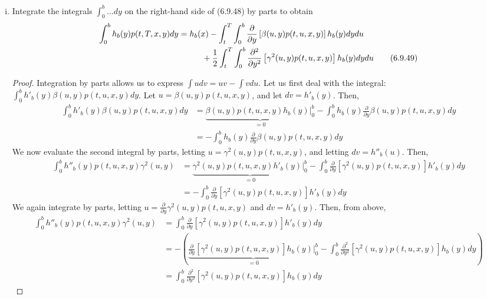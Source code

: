 \documentclass{article}
\theoremstyle{definition}
\theoremstyle{definition}
\begin{document}
\begin{enumerate}
\begin{enumerate}[(i)]
    \item Integrate the integrals $\int_0^b \hdots dy$ on the right-hand side of (6.9.48) by parts to obtain
       \begin{align}
        \int_0^b h_b(y) p(t,T,x,y) dy &= h_b(x) - \int_t^T \int_0^b \frac{\partial}{\partial y} \left[ \beta(u,y)p(t,u,x,y) \right] h_b(y) dy du  \notag \\
        & \hspace{1cm} + \frac{1}{2}\int_t^T \int_0^b  \frac{\partial^2}{\partial y^2} \left[ \gamma^2(u,y) p(t,u,x,y)\right] h_b(y) dydu \tag{6.9.49}
    \end{align}
    \begin{proof}
    Integration by parts allows us to express $\int u dv = uv -\int v du$. Let us first deal with the integral: $\int_0^b h'_b(y) \beta(u,y) p(t,u,x,y)dy$. Let $u=\beta(u,y)p(t,u,x,y)$, and let $dv=h'_b(y)$. Then,
    \begin{align*}
        \int_0^b h'_b(y) \beta(u,y) p(t,u,x,y)dy &= \underset{=0}{\underbrace{\beta(u,y)p(t,u,x,y)h_b(y) |^b_0}} - \int_0^b h_b(y) \frac{\partial}{\partial y}\beta(u,y)p(t,u,x,y)dy \\
        &=- \int_0^b h_b(y) \frac{\partial}{\partial y}\beta(u,y)p(t,u,x,y)dy
    \end{align*}
    We now evaluate the second integral by parts, letting $u =\gamma^2(u,y)p(t,u,x,y) $, and letting $dv=h''_b(u)$. Then,
    \begin{align*}\int_0^b h''_b(y)p(t,u,x,y) \gamma^2(u,y)&=\underset{=0}{\underbrace{\gamma^2(u,y)p(t,u,x,y)h'_b(y)|^b_0}} - \int_0^b \frac{\partial}{\partial y} \left[\gamma^2(u,y)p(t,u,x,y)\right]h'_b(y)dy \\
    &=- \int_0^b \frac{\partial}{\partial y} \left[\gamma^2(u,y)p(t,u,x,y)\right]h'_b(y)dy 
    \end{align*}
    We again integrate by parts, letting $u=\frac{\partial}{\partial y}\gamma^2(u,y)p(t,u,x,y)$ and $dv = h'_b(y)$. Then, from above,
    \begin{align*}
        \int_0^b h''_b(y)p(t,u,x,y) \gamma^2(u,y)&=\int_0^b \frac{\partial}{\partial y} \left[\gamma^2(u,y)p(t,u,x,y)\right]h'_b(y)dy  \\
        &= -\left( \underset{=0}{\underbrace{\frac{\partial}{\partial y}\left[\gamma^2(u,y)p(t,u,x,y)\right]h_b(y)|^b_0}} -\int_0^b \frac{\partial^2}{\partial y^2} \left[ \gamma^2(u,y) p(t,u,x,y)\right] h_b(y) dy \right) \\
        &= \int_0^b \frac{\partial^2}{\partial y^2} \left[ \gamma^2(u,y) p(t,u,x,y)\right] h_b(y) dy 

\end{align*}
\end{proof}
\end{enumerate}
\end{enumerate}
\end{document}
